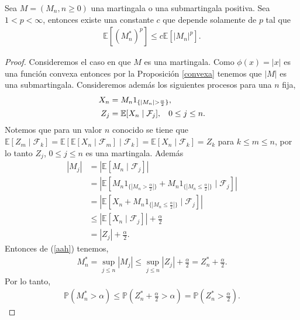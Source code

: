 \begin{theorem}
\label{lp}
	Sea $M = (M_n, n \geq 0)$ una martingala o una submartingala positiva. Sea $1 < p < \infty$, entonces existe una constante $c$ que depende solamente de $p$ tal que
	\begin{align*}
		\mathbb{E}[(M_n^{*})^p] \leq c\mathbb{E}[|M_n|^p].
	\end{align*}
\end{theorem}
\begin{proof}
	Consideremos el caso en que $M$ es una martingala. Como $\phi(x) = |x|$ es una función convexa entonces por la Proposición \ref{convexa} tenemos que $|M|$ es una submartingala. Consideremos además los siguientes procesos para una $n$ fija,
	\begin{align*}
		X_n & = M_n1_{\{|M_n| > \frac{\alpha}{2} \} }, \\
		Z_j & = \mathbb{E}[X_n \mid \mathcal{F}_j], \hspace{0.3cm} 0 \leq j \leq n.
	\end{align*}
	Notemos que para un valor $n$ conocido se tiene que $\mathbb{E}[Z_m \mid \mathcal{F}_k] = \mathbb{E}[\mathbb{E}[X_n \mid \mathcal{F}_m] \mid \mathcal{F}_k] = \mathbb{E}[X_n \mid \mathcal{F}_k] = Z_k$ para $k \leq m \leq n$, por lo tanto $Z_j$, $0 \leq j \leq n$ es una martingala. Además
	\begin{align}
		|M_j| & = |\mathbb{E}[M_n \mid \mathcal{F}_j]| \nonumber \\
		& = \left|\mathbb{E}\left[ M_n 1_{\{|M_n > \frac{\alpha}{2}|\}} + M_n 1_{\{|M_n \leq \frac{\alpha}{2}|\}} \mid \mathcal{F}_j \right] \right| \nonumber \\
		& = \left| \mathbb{E}\left[X_n + M_n 1_{\{|M_n \leq \frac{\alpha}{2}|\}} \mid \mathcal{F}_j \right] \right| \nonumber \\
		& \leq \left| \mathbb{E}\left[ X_n \mid \mathcal{F}_j \right] \right| + \frac{\alpha}{2} \nonumber \\
		& = |Z_j| + \frac{\alpha}{2}. \label{aah}
	\end{align}
	Entonces de (\ref{aah}) tenemos, 
	\begin{align*}
		M_n^{*} = \sup_{j \leq n} |M_j| \leq \sup_{j \leq n} |Z_j| + \frac{\alpha}{2} = Z_n^{*} + \frac{\alpha}{2}.
	\end{align*}
	Por lo tanto, 
	\begin{align}
		\mathbb{P}(M_n^{*} > \alpha) \leq \mathbb{P}(Z_n^{*} + \frac{\alpha}{2} > \alpha) =  \mathbb{P}(Z_n^{*} > \frac{\alpha}{2}). \label{aai}

\end{align}
\end{proof}

